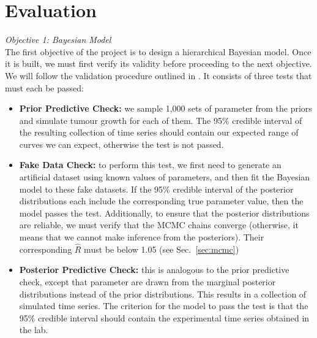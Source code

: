 \documentclass[11pt]{article}
\begin{document}
\section{Evaluation}\label{sec:eval}
\textit{Objective 1: Bayesian Model}\\[3pt]
    The first objective of the project is to design a hierarchical Bayesian model. Once it is built, we must first verify its validity before proceeding to the next objective. We will follow the validation procedure outlined in \cite{gelman2020bayesian}. It consists of three tests that must each be passed:
\begin{itemize}
    \item \textbf{Prior Predictive Check:} we sample 1,000 sets of parameter from the priors and simulate tumour growth for each of them. The 95\% credible interval of the resulting collection of time series should contain our expected range of curves we can expect, otherwise the test is not passed.
    \item \textbf{Fake Data Check:} to perform this test, we first need to generate an artificial dataset using known values of parameters, and then fit the Bayesian model to these fake datasets. If the 95\% credible interval of the posterior distributions each include the corresponding true parameter value, then the model passes the test. Additionally, to ensure that the posterior distributions are reliable, we must verify that the MCMC chains converge (otherwise, it means that we cannot make inference from the posteriors). Their corresponding $\hat{R}$ must be below 1.05 (see Sec.~\ref{sec:mcmc})
    \item \textbf{Posterior Predictive Check:} this is analogous to the prior predictive check, except that parameter are drawn from the marginal posterior distributions instead of the prior distributions. This results in a collection of simulated time series. The criterion for the model to pass the test is that the 95\% credible interval should contain the experimental time series obtained in the lab. 
\end{itemize}
\end{document}
